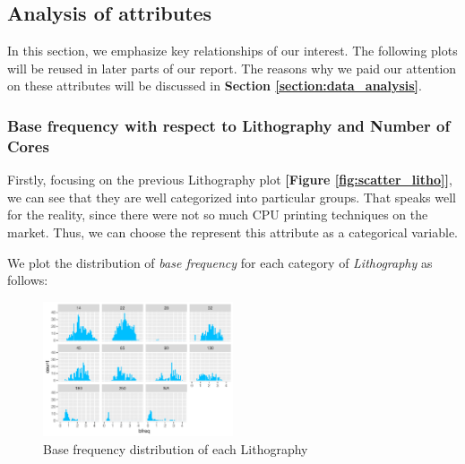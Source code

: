 








\subsection{Analysis of attributes}

In this section, we emphasize key relationships of our interest. The following plots will be reused in later parts of our report. The reasons why we paid our
attention on these attributes will be discussed in \textbf{Section \ref{section:data_analysis}}.



\subsubsection{Base frequency with respect to Lithography and Number of Cores}

Firstly, focusing on the previous Lithography plot \textbf{[Figure \ref{fig:scatter_litho}]}, we can see that they are well categorized into particular groups.
That speaks well for the reality, since there were not so much CPU printing techniques on the market.
Thus, we can choose the represent this attribute as a categorical variable.

We plot the distribution of \textit{base frequency} for each category of \textit{Lithography} as follows:

\begin{figure}[H]
    \centering
    \includegraphics[width=0.5\textwidth]{./graphics/hist_bfreq_wrt_litho.pdf}
    \caption{Base frequency distribution of each Lithography}
    \label{fig:hist_bfreq_wrt_litho}
\end{figure}

